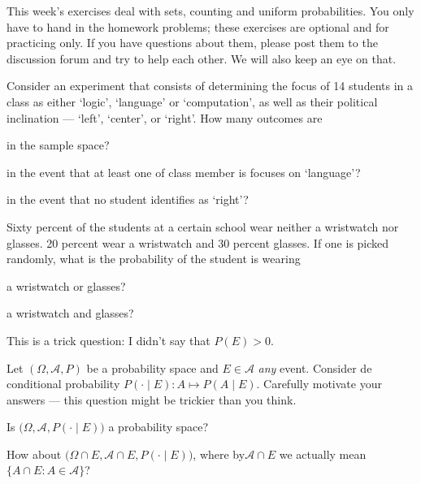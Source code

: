 \documentclass[a4paper,10pt,landscape,twocolumn]{scrartcl}
\begin{document}
\practiceproblems

{\sffamily\noindent
This week's exercises deal with sets, counting and uniform probabilities. You only have to hand in the homework problems; these exercises are optional and for practicing only. If you have questions about them, please post them to the discussion forum and try to help each other. We will also keep an eye on that.
}


\begin{exercise}[]
	 Consider an experiment that consists of determining the focus of 14 students in a class as either `logic', `language' or `computation', as well as their political inclination --- `left', `center', or `right'. How many outcomes are
	 
	 \begin{subex}
	 	in the sample space?
	 \end{subex}
	 
	 \begin{subex}
	 	in the event that at least one of class member is focuses on `language'?
	 \end{subex}
	 
	 \begin{subex}
	 	in the event that no student identifies as `right'?
	 \end{subex}
\end{exercise}

\begin{exercise}[]
	 Sixty percent of the students at a certain school wear neither a wristwatch nor glasses. 20 percent wear a wristwatch and 30 percent glasses. If one is picked randomly, what is the probability of the student is wearing
	
	\begin{subex}
		a wristwatch or glasses?
	\end{subex}
	
	\begin{subex}
		a wristwatch and glasses?
	\end{subex}
		
\end{exercise}


\begin{exercise}[]
\begin{mycomment}
	This is a trick question: I didn't say that $P(E)>0$.
\end{mycomment}
Let $(\Omega, \mathcal{A}, P)$ be a probability space and $E\in \mathcal{A}$ \emph{any} event. Consider de conditional probability $P( \cdot \mid E): A \mapsto P(A\mid E)$. Carefully motivate your answers --- this question might be trickier than you think.
	\begin{subex}
		Is $\bigl(\Omega, \mathcal A, P(\cdot \mid E)\bigr)$ a probability space?	
	\end{subex}
	\begin{subex}
		How about $\bigl(\Omega\cap E, \mathcal A\cap E, P(\cdot \mid E)\bigr)$, where by$\mathcal A \cap E$ we actually mean $\{A\cap E: A\in \mathcal A\}$?
	\end{subex}
\end{exercise}
\end{document}

